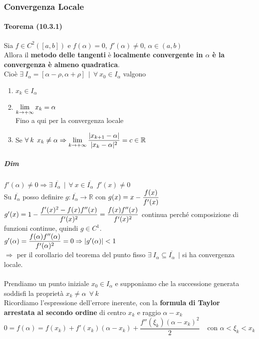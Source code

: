 \documentclass[10pt]{book}
\begin{document}
\subsubsection{Convergenza Locale}
\paragraph{Teorema (10.3.1)} Sia $f\in C^2([a, b])$ e $f(\alpha) = 0$, $f'(\alpha) \neq 0$, $\alpha \in (a, b)$\\
Allora il \textbf{metodo delle tangenti} è \textbf{localmente convergente in $\alpha$ è la convergenza è almeno quadratica}.\\Cioè $\exists\:I_\alpha = [\alpha - \rho, \alpha + \rho]\:\:|\:\:\forall\:x_0\in I_\alpha$ valgono
\begin{enumerate}
	\item $x_k \in I_\alpha$
	\item $\mathlarger{\lim_{k\to+\infty} x_k = \alpha}$\\
	Fino a qui per la convergenza locale
	\item Se $\forall\:k\:\:x_k\neq\alpha \Rightarrow \mathlarger{\lim_{k\to+\infty} \frac{|x_{k+1} - \alpha|}{|x_k - \alpha|^2}} = c \in \mathbb{R}$
\end{enumerate}
\subparagraph{Dim} $f'(\alpha) \neq 0 \Rightarrow \exists\:\overline{I_{\alpha}}\:\:|\:\: \forall\:x\in\overline{I_\alpha}\:\:f'(x)\neq 0$\\
Su $\overline{I_\alpha}$ posso definire $g : \overline{I_\alpha} \rightarrow \mathbb{R}$ con $g(x) = x -\mathlarger{\frac{f(x)}{f'(x)}}$\\
$g'(x) = 1 - \mathlarger{\frac{f'(x)^2 - f(x)f''(x)}{f'(x)^2}} = \mathlarger{\frac{f(x)f''(x)}{f'(x)^2}}$ continua perché composizione di funzioni continue, quindi $g \in C^1$.\\
$g'(\alpha) = \mathlarger{\frac{f(\alpha)f''(\alpha)}{f'(\alpha)^2}} = 0 \Rightarrow |g'(\alpha)| < 1$\\ $\Rightarrow$ per il corollario del teorema del punto fisso $\exists\:I_\alpha\subseteq\overline{I_\alpha}\:\:|$ si ha convergenza locale.\\\\
Prendiamo un punto iniziale $x_0 \in I_\alpha$ e supponiamo che la successione generata soddisfi la proprietà $x_k \neq \alpha\:\:\forall\: k$\\
Ricordiamo l'espressione dell'errore inerente, con la \textbf{formula di Taylor arrestata al secondo ordine} di centro $x_k$ e raggio $\alpha - x_k$
$$0 = f(\alpha) = f(x_k) + f'(x_k)(\alpha - x_k) + \frac{f''(\xi_k)(\alpha - x_k)^2}{2}\:\:\:\:\:\text{con }\alpha < \xi_k < x_k$$
\end{document}
